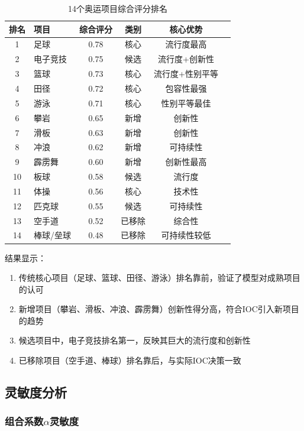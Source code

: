 \begin{table}[htbp]
\centering
\caption{14个奥运项目综合评分排名}
\label{tab:ranking_results}
\begin{tabular}{clcccc}
\toprule
排名 & 项目 & 综合评分 & 类别 & 核心优势 \\
\midrule
1 & 足球 & 0.78 & 核心 & 流行度最高 \\
2 & 电子竞技 & 0.75 & 候选 & 流行度+创新性 \\
3 & 篮球 & 0.73 & 核心 & 流行度+性别平等 \\
4 & 田径 & 0.72 & 核心 & 包容性最强 \\
5 & 游泳 & 0.71 & 核心 & 性别平等最佳 \\
6 & 攀岩 & 0.65 & 新增 & 创新性 \\
7 & 滑板 & 0.63 & 新增 & 创新性 \\
8 & 冲浪 & 0.62 & 新增 & 可持续性 \\
9 & 霹雳舞 & 0.60 & 新增 & 创新性最高 \\
10 & 板球 & 0.58 & 候选 & 流行度 \\
11 & 体操 & 0.56 & 核心 & 技术性 \\
12 & 匹克球 & 0.55 & 候选 & 可持续性 \\
13 & 空手道 & 0.52 & 已移除 & 综合性 \\
14 & 棒球/垒球 & 0.48 & 已移除 & 可持续性较低 \\
\bottomrule
\end{tabular}
\end{table}

结果显示：
\begin{enumerate}
\item 传统核心项目（足球、篮球、田径、游泳）排名靠前，验证了模型对成熟项目的认可
\item 新增项目（攀岩、滑板、冲浪、霹雳舞）创新性得分高，符合IOC引入新项目的趋势
\item 候选项目中，电子竞技排名第一，反映其巨大的流行度和创新性
\item 已移除项目（空手道、棒球）排名靠后，与实际IOC决策一致
\end{enumerate}

\subsection{灵敏度分析}

\subsubsection{组合系数$\alpha$灵敏度}

